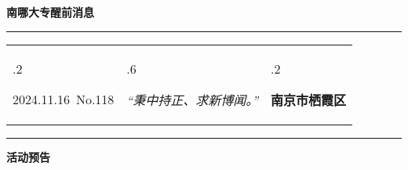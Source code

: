 \documentclass[letterpaper, 12pt]{article}
\begin{document}
\begin{center}
    \Huge\textbf{南哪大专醒前消息}
\end{center}
\vspace{4mm}
\hrule
\renewcommand\tabularxcolumn[1]{m{#1}}
\begin{tabularx}{\textwidth}{>{\hsize.2\hsize}X>{\hsize.6\hsize}X>{\hsize.2\hsize}X}
    \begin{flushleft}
        2024.11.16\, No.118
    \end{flushleft}
    &
    \begin{center}
        \textit{“秉中持正、求新博闻。”}
    \end{center}
    &
    \begin{flushright}
        \textbf{南京市栖霞区}
    \end{flushright}
\end{tabularx}
\vspace{-3.5mm}
\hrule
\vspace{4mm}
\centerline{\huge\textbf{活动预告}}
\end{document}
